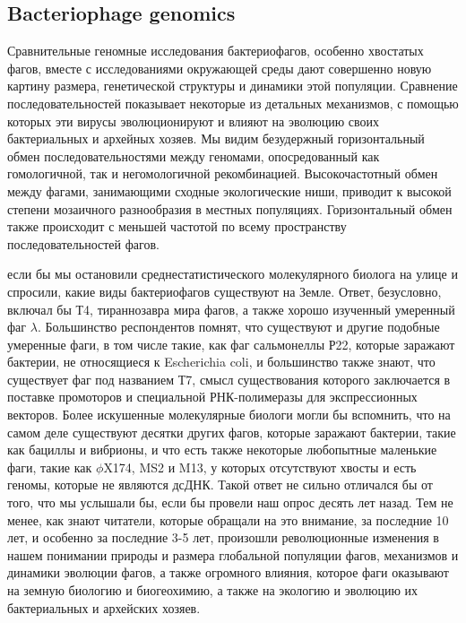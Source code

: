\documentclass[a4paper,12pt]{article}
\begin{document}
\begin{center}
   \item \subsection{Bacteriophage genomics \cite{genomics}}
\end{center}
    \par{Сравнительные геномные исследования бактериофагов, особенно хвостатых фагов, вместе с исследованиями окружающей
    среды дают совершенно новую картину размера, генетической структуры и динамики этой популяции. Сравнение
    последовательностей показывает некоторые из детальных механизмов, с помощью которых эти вирусы эволюционируют и
    влияют на эволюцию своих бактериальных и архейных хозяев. Мы видим безудержный горизонтальный обмен
    последовательностями между геномами, опосредованный как гомологичной, так и негомологичной рекомбинацией.
    Высокочастотный обмен между фагами, занимающими сходные экологические ниши, приводит к высокой степени мозаичного
    разнообразия в местных популяциях. Горизонтальный обмен также происходит с меньшей частотой по всему пространству
    последовательностей фагов.}
    
    \par{если бы мы остановили среднестатистического молекулярного биолога на улице и спросили, какие виды бактериофагов
    существуют на Земле. Ответ, безусловно, включал бы Т4, тираннозавра мира фагов, а также хорошо изученный умеренный
    фаг \(\lambda\). Большинство респондентов помнят, что существуют и другие подобные умеренные фаги, в том числе
    такие, как фаг сальмонеллы Р22, которые заражают бактерии, не относящиеся к Escherichia coli, и большинство также
    знают, что существует фаг под названием Т7, смысл существования которого заключается в поставке промоторов и
    специальной РНК-полимеразы для экспрессионных векторов. Более искушенные молекулярные биологи могли бы вспомнить,
    что на самом деле существуют десятки других фагов, которые заражают бактерии, такие как бациллы и вибрионы, и что
    есть также некоторые любопытные маленькие фаги, такие как $\phi$X174, MS2 и M13, у которых отсутствуют хвосты и есть
    геномы, которые не являются дсДНК. Такой ответ не сильно отличался бы от того, что мы услышали бы, если бы провели
    наш опрос десять лет назад. Тем не менее, как знают читатели, которые обращали на это внимание, за последние 10 лет,
    и особенно за последние 3-5 лет, произошли революционные изменения в нашем понимании природы и размера глобальной
    популяции фагов, механизмов и динамики эволюции фагов, а также огромного влияния, которое фаги оказывают на земную
    биологию и биогеохимию, а также на экологию и эволюцию их бактериальных и архейских хозяев.}
    
\end{document}
